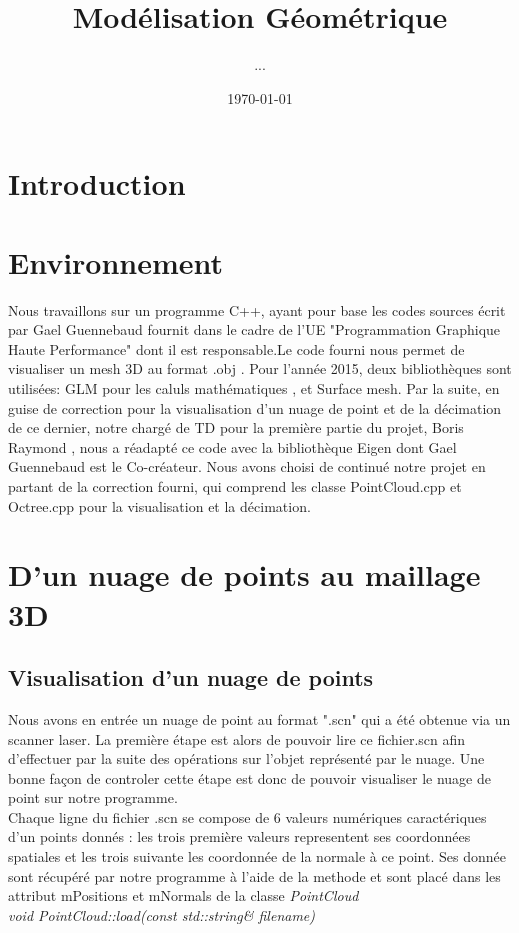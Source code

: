 \documentclass{article}
\title{Modélisation Géométrique}
\author{...}
\date{\today}
\begin{document}
\maketitle

\section{Introduction}




\section{Environnement}
Nous travaillons sur un programme C++, ayant pour base les codes sources écrit par Gael Guennebaud \cite{GGSite} fournit dans le cadre de l'UE "Programmation Graphique Haute Performance" \cite{GGPghp} dont il est responsable.Le code fourni nous permet de visualiser un mesh 3D au format .obj . Pour l'année 2015, deux bibliothèques sont utilisées: GLM\cite{GLM} pour les caluls mathématiques ,  et Surface mesh\cite{}. Par la suite, en guise de correction pour la visualisation d'un nuage de point et de la décimation de ce dernier, notre chargé de TD pour la première partie du projet, Boris Raymond \cite{BRSite}, nous a réadapté ce code avec la bibliothèque Eigen \cite{GGaward,eigen} dont Gael Guennebaud est le Co-créateur. Nous avons choisi de continué notre projet en partant de la correction fourni, qui comprend les classe PointCloud.cpp et Octree.cpp pour la visualisation et la décimation. 


\section{D'un nuage de points au maillage 3D}

\subsection{Visualisation d'un nuage de points}
Nous avons en entrée un nuage de point au format ".scn" qui a été obtenue via un scanner laser. La première étape est alors de pouvoir lire ce fichier.scn afin d'effectuer par la suite des opérations sur l'objet représenté par le nuage. Une bonne façon de controler cette étape est donc de pouvoir visualiser le nuage de point sur notre programme.\\
Chaque ligne du fichier .scn se compose de 6 valeurs numériques caractériques d'un points donnés : les trois première valeurs representent ses coordonnées spatiales et les trois suivante les coordonnée de la normale à ce point.
Ses donnée sont récupéré par notre programme à l'aide de la methode et sont placé dans les attribut mPositions et mNormals de la classe \textit{PointCloud}\\ \textit{void PointCloud::load(const std::string\& filename)}
\end{document}
